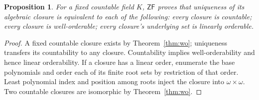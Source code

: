 \documentclass[11pt,a4paper]{article}
\newtheorem{proposition}[theorem]{Proposition}
\theoremstyle{definition}\newtheorem{definition}[theorem]{Definition}
\theoremstyle{remark}\newtheorem{remark}[theorem]{Remark}
\newcommand{\ZF}{\mathsf{ZF}}\newcommand{\ZFA}{\mathsf{ZFA}}
\begin{document}
\begin{proposition}\label{prop:countable}
For a fixed countable field $K$, $\ZF$ proves that uniqueness of its algebraic closure is equivalent to each of the following: every closure is countable; every closure is well-orderable; every closure's underlying set is linearly orderable.
\end{proposition}
\begin{proof}
A fixed countable closure exists by Theorem~\ref{thm:wo}; uniqueness transfers its countability to any closure. Countability implies well-orderability and hence linear orderability. If a closure has a linear order, enumerate the base polynomials and order each of its finite root sets by restriction of that order. Least polynomial index and position among roots inject the closure into $\omega\times\omega$. Two countable closures are isomorphic by Theorem~\ref{thm:wo}.
\end{proof}
\end{document}
